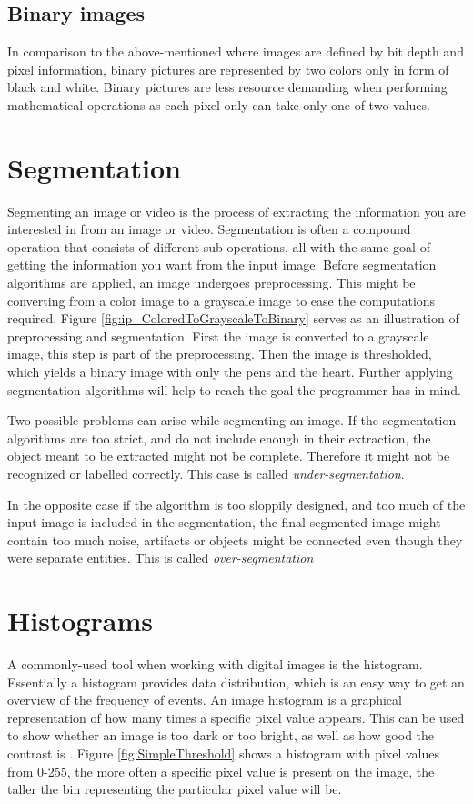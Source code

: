 \subsection{Binary images}
In comparison to the above-mentioned where images are defined by bit depth and pixel information, binary pictures are represented by two colors only in form of black and white. Binary pictures are less resource demanding when performing mathematical operations as each pixel only can take only one of two values.


\section{Segmentation}

Segmenting an image or video is the process of extracting the information you are interested in from an image or video. Segmentation is often a compound operation that consists of different sub operations, all with the same goal of getting the information you want from the input image. Before segmentation algorithms are applied, an image undergoes preprocessing. This might be converting from a color image to a grayscale image to ease the computations required. Figure \ref{fig:ip_ColoredToGrayscaleToBinary} serves as an illustration of preprocessing and segmentation. First the image is converted to a grayscale image, this step is part of the preprocessing. Then the image is thresholded, which yields a binary image with only the pens and the heart. Further applying segmentation algorithms will help to reach the goal the programmer has in mind.

Two possible problems can arise while segmenting an image. If the segmentation algorithms are too strict, and do not include enough in their extraction, the object meant to be extracted might not be complete. Therefore it might not be recognized or labelled correctly. This case is called \textit{under-segmentation}.

In the opposite case if the algorithm is too sloppily designed, and too much of the input image is included in the segmentation, the final segmented image might contain too much noise, artifacts or objects might be connected even though they were separate entities. This is called \textit{over-segmentation}

\section{Histograms}
A commonly-used tool when working with digital images is the histogram. Essentially a histogram provides data distribution, which is an easy way to get an overview of the frequency of events. An image histogram is a graphical representation of how many times a specific pixel value appears. This can be used to show whether an image is too dark or too bright, as well as how good the contrast is \citep{ip_book}. Figure \ref{fig:SimpleThreshold} shows a histogram with pixel values from 0-255, the more often a specific pixel value is present on the image, the taller the bin representing the particular pixel value will be.

